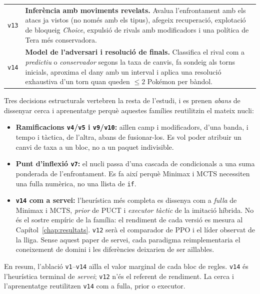 \begin{table}[htbp]
\begin{tabularx}{\textwidth}{lX}
        \arrayrulecolor{gray!30}\hline\arrayrulecolor{black}
        \texttt{v13}    & \textbf{Inferència amb moviments revelats.} Avalua l'enfrontament amb els atacs ja vistos (no només amb els tipus), afegeix recuperació, explotació de bloqueig \emph{Choice}, expulsió de rivals amb modificadors i una política de Tera més conservadora.                                         \\
        \arrayrulecolor{gray!30}\hline\arrayrulecolor{black}
        \texttt{v14}    & \textbf{Model de l'adversari i resolució de finals.} Classifica el rival com a \emph{predictiu} o \emph{conservador} segons la taxa de canvis, fa sondeig als torns inicials, aproxima el dany amb un interval i aplica una resolució exhaustiva d'un torn quan queden $\leq 2$ Pokémon per bàndol. \\
        \bottomrule
    \end{tabularx}
\end{table}

Tres decisions estructurals vertebren la resta de l'estudi, i es prenen \emph{abans} de dissenyar cerca i aprenentatge perquè aquestes famílies reutilitzin el mateix nucli:

\begin{itemize}
    \item \textbf{Ramificacions \texttt{v4}/\texttt{v5} i \texttt{v9}/\texttt{v10}:} aïllen camp i modificadors, d'una banda, i tempo i tàctica, de l'altra, abans de fusionar-los. Es vol poder atribuir un canvi de taxa a un bloc, no a un paquet indivisible.
    \item \textbf{Punt d'inflexió \texttt{v7}:} el nucli passa d'una cascada de condicionals a una suma ponderada de l'enfrontament. Es fa així perquè Minimax i MCTS necessiten una fulla numèrica, no una llista de \texttt{if}.
    \item \textbf{\texttt{v14} com a servei:} l'heurística més completa es dissenya com a \emph{fulla} de Minimax i MCTS, \emph{prior} de PUCT i \emph{executor tàctic} de la imitació híbrida. No és el sostre empíric de la família: el rendiment de cada versió es mesura al Capítol~\ref{chap:resultats}. \texttt{v12} serà el comparador de PPO i el líder observat de la lliga. Sense aquest paper de servei, cada paradigma reimplementaria el coneixement de domini i les diferències deixarien de ser aïllables.
\end{itemize}

En resum, l'ablació \texttt{v1}--\texttt{v14} aïlla el valor marginal de cada bloc de regles. \texttt{v14} és l'heurística terminal de \emph{servei}; \texttt{v12} n'és el referent de rendiment. La cerca i l'aprenentatge reutilitzen \texttt{v14} com a fulla, prior o executor.

